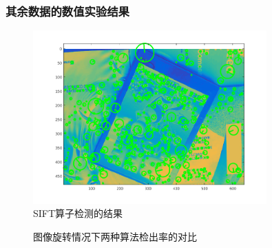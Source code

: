 \documentclass[a4paper, UTF8]{ctexrep}
\begin{document}
			\subsubsection{其余数据的数值实验结果}
				\begin{figure}[htbp!]
					\centering
					\includegraphics[width=0.8\textwidth]{hw1_fig12.png}
					\caption{SIFT算子检测的结果}
				\end{figure}
				\begin{figure}[htbp!]
					\centering
					\caption{图像旋转情况下两种算法检出率的对比}
				\end{figure}
\end{document}
